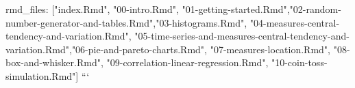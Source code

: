 rmd_files: ["index.Rmd", "00-intro.Rmd", "01-getting-started.Rmd","02-random-number-generator-and-tables.Rmd","03-histograms.Rmd", "04-measures-central-tendency-and-variation.Rmd",
"05-time-series-and-measures-central-tendency-and-variation.Rmd","06-pie-and-pareto-charts.Rmd", "07-measures-location.Rmd",
"08-box-and-whisker.Rmd", "09-correlation-linear-regression.Rmd", "10-coin-toss-simulation.Rmd"]
```